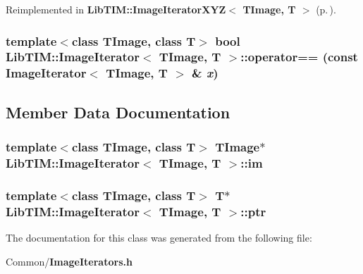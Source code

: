Reimplemented in {\bf Lib\-TIM::Image\-Iterator\-XYZ$<$ TImage, T $>$} {\rm (p.\,\pageref{classLibTIM_1_1ImageIteratorXYZ_a5})}.
\subsubsection{\setlength{\rightskip}{0pt plus 5cm}template$<$class TImage, class T$>$ bool {\bf Lib\-TIM::Image\-Iterator}$<$ TImage, T $>$::operator== (const {\bf Image\-Iterator}$<$ TImage, T $>$ \& {\em x})\hspace{0.3cm}{\tt  [inline]}}\label{classLibTIM_1_1ImageIterator_a6}




\subsection{Member Data Documentation}
\subsubsection{\setlength{\rightskip}{0pt plus 5cm}template$<$class TImage, class T$>$ TImage$\ast$ {\bf Lib\-TIM::Image\-Iterator}$<$ TImage, T $>$::{\bf im}}\label{classLibTIM_1_1ImageIterator_o1}


\subsubsection{\setlength{\rightskip}{0pt plus 5cm}template$<$class TImage, class T$>$ T$\ast$ {\bf Lib\-TIM::Image\-Iterator}$<$ TImage, T $>$::{\bf ptr}}\label{classLibTIM_1_1ImageIterator_o0}




The documentation for this class was generated from the following file:\begin{CompactItemize}
\item 
Common/{\bf Image\-Iterators.h}\end{CompactItemize}
